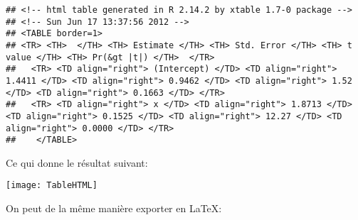 \begin{knitrout}
\color{fgcolor}\begin{kframe}
\begin{flushleft}
\ttfamily\noindent
{}\hlkeyword{(}\hlkeyword{,}{\ }\hlargument{=}{\ }\hlkeyword{)}\mbox{}
\normalfont
\end{flushleft}
\begin{verbatim}
## <!-- html table generated in R 2.14.2 by xtable 1.7-0 package -->
## <!-- Sun Jun 17 13:37:56 2012 -->
## <TABLE border=1>
## <TR> <TH>  </TH> <TH> Estimate </TH> <TH> Std. Error </TH> <TH> t value </TH> <TH> Pr(&gt |t|) </TH>  </TR>
##   <TR> <TD align="right"> (Intercept) </TD> <TD align="right"> 1.4411 </TD> <TD align="right"> 0.9462 </TD> <TD align="right"> 1.52 </TD> <TD align="right"> 0.1663 </TD> </TR>
##   <TR> <TD align="right"> x </TD> <TD align="right"> 1.8713 </TD> <TD align="right"> 0.1525 </TD> <TD align="right"> 12.27 </TD> <TD align="right"> 0.0000 </TD> </TR>
##    </TABLE>
\end{verbatim}
\begin{flushleft}
\ttfamily\noindent
{}\hlkeyword{(}\hlkeyword{,}{\ }\hlargument{=}{\ }\hlkeyword{,}{\ }\hlargument{=}{\ }\hlkeyword{)}\mbox{}
\normalfont
\end{flushleft}
\end{kframe}
\end{knitrout}


Ce qui donne le résultat suivant:

\begin{center}
\texttt{[image: TableHTML]}
\end{center}

On peut de la même manière exporter en \LaTeX:


